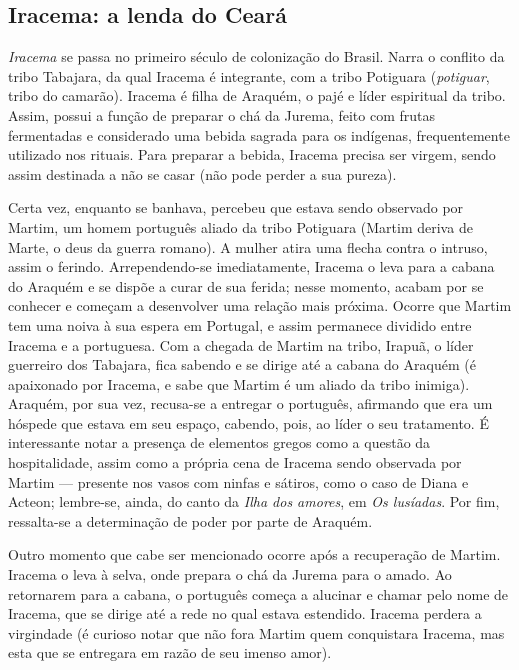 \documentclass[12pt]{book}
\begin{document}
				\subsection{Iracema: a lenda do Ceará}
				\par \textit{Iracema} se passa no primeiro século de colonização do Brasil. Narra o conflito da tribo Tabajara, da qual Iracema é integrante, com a tribo Potiguara (\textit{potiguar}, tribo do camarão). Iracema é filha de Araquém, o pajé e líder espiritual da tribo. Assim, possui a função de preparar o chá da Jurema, feito com frutas fermentadas e considerado uma bebida sagrada para os indígenas, frequentemente utilizado nos rituais. Para preparar a bebida, Iracema precisa ser virgem, sendo assim destinada a não se casar (não pode perder a sua pureza).
				\par Certa vez, enquanto se banhava, percebeu que estava sendo observado por Martim, um homem português aliado da tribo Potiguara (Martim deriva de Marte, o deus da guerra romano). A mulher atira uma flecha contra o intruso, assim o ferindo. Arrependendo-se imediatamente, Iracema o leva para a cabana do Araquém e se dispõe a curar de sua ferida; nesse momento, acabam por se conhecer e começam a desenvolver uma relação mais próxima. Ocorre que Martim tem uma noiva à sua espera em Portugal, e assim permanece dividido entre Iracema e a portuguesa. Com a chegada de Martim na tribo, Irapuã, o líder guerreiro dos Tabajara, fica sabendo e se dirige até a cabana do Araquém (é apaixonado por Iracema, e sabe que Martim é um aliado da tribo inimiga). Araquém, por sua vez, recusa-se a entregar o português, afirmando que era um hóspede que estava em seu espaço, cabendo, pois, ao líder o seu tratamento. É interessante notar a presença de elementos gregos como a questão da hospitalidade, assim como a própria cena de Iracema sendo observada por Martim — presente nos vasos com ninfas e sátiros, como o caso de Diana e Acteon; lembre-se, ainda, do canto da \textit{Ilha dos amores}, em \textit{Os lusíadas}. Por fim, ressalta-se a determinação de poder por parte de Araquém.
				\par Outro momento que cabe ser mencionado ocorre após a recuperação de Martim. Iracema o leva à selva, onde prepara o chá da Jurema para o amado. Ao retornarem para a cabana, o português começa a alucinar e chamar pelo nome de Iracema, que se dirige até a rede no qual estava estendido. Iracema perdera a virgindade (é curioso notar que não fora Martim quem conquistara Iracema, mas esta que se entregara em razão de seu imenso amor).
\end{document}
